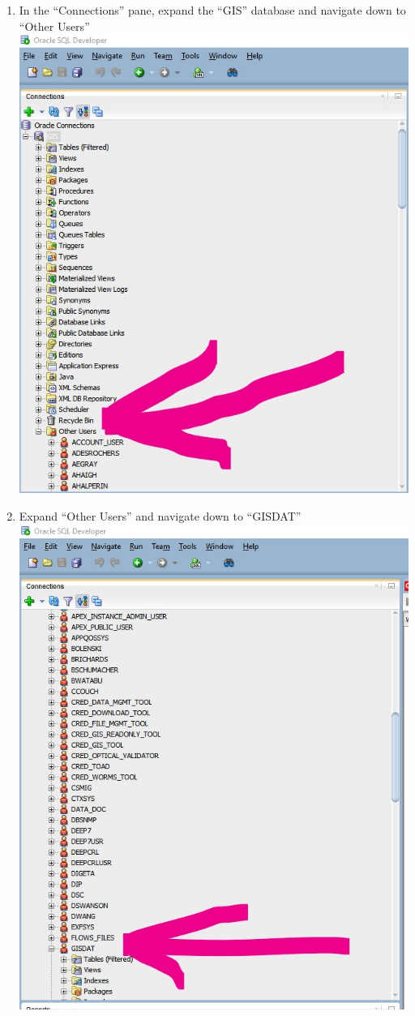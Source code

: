 \documentclass[]{book}
\begin{document}
\begin{enumerate}
\item
  In the ``Connections'' pane, expand the ``GIS'' database and navigate down to ``Other Users''
  \includegraphics{images/SQL_Dev_Screenshot_3.jpg}
\item
  Expand ``Other Users'' and navigate down to ``GISDAT''
  \includegraphics{images/SQL_Dev_Screenshot_4.jpg}

\end{enumerate}
\end{document}
